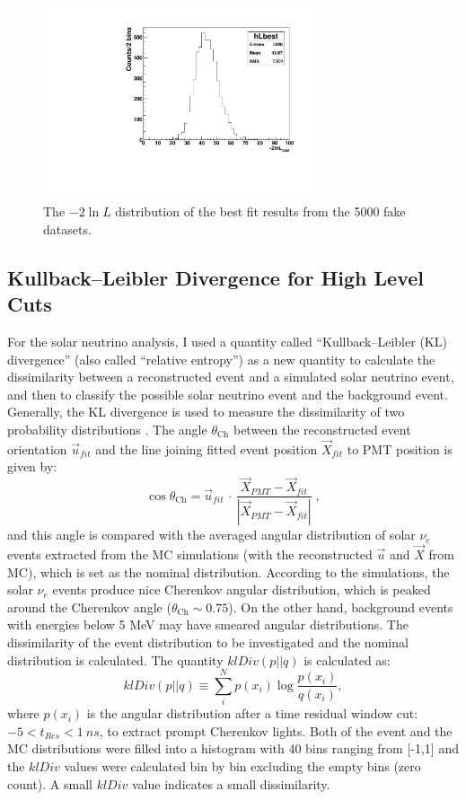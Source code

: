 \begin{figure}[!htb]
	\centering
	\includegraphics[width=8cm]{ensemble_lnLbest.pdf}
	\caption{The $-2\ln L$ distribution of the best fit results from the 5000 fake datasets.}
	\label{poisson_fitLnL}
\end{figure}

\subsection{Kullback–Leibler Divergence for High Level Cuts}

For the solar neutrino analysis, I used a quantity called ``Kullback–Leibler (KL) divergence'' (also called ``relative entropy'') as a new quantity to calculate the dissimilarity between a reconstructed event and a simulated solar neutrino event, and then to classify the possible solar neutrino event and the background event. Generally, the KL divergence is used to measure the dissimilarity of two probability distributions \cite{murphy2012machine}. The angle $\theta_\mathrm{Ch}$ between the reconstructed event orientation $\vec{u}_{fit}$ and the line joining fitted event position $\vec{X}_{fit}$ to PMT position is given by:
\begin{equation*}
\cos\theta_\mathrm{Ch}=\vec{u}_{fit} \, \cdot \, \frac{\vec{X}_{PMT}-\vec{X}_{fit}}{|\vec{X}_{PMT}-\vec{X}_{fit}|} \; ,
\end{equation*}
and this angle is compared with the averaged angular distribution of solar $\nu_e$ events extracted from the MC simulations (with the reconstructed $\vec{u}$ and $\vec{X}$ from MC), which is set as the nominal distribution. According to the simulations, the solar $\nu_e$ events produce nice Cherenkov angular distribution, which is peaked around the Cherenkov angle ($\theta_\mathrm{Ch}\sim 0.75$). On the other hand, background events with energies below 5 MeV may have smeared angular distributions. The dissimilarity of the event distribution to be investigated and the nominal distribution is calculated. The quantity $klDiv(p||q)$ is calculated as: 
\begin{equation}\label{eq:kldiv}
klDiv(p||q) \equiv \sum_{i}^N p(x_i)\log{\frac{p(x_i)}{q(x_i)}},
\end{equation}
where $p(x_i)$ is the angular distribution after a time residual window cut: $-5<t_{Res}<1~ns$, to extract prompt Cherenkov lights. Both of the event and the MC distributions were filled into a histogram with 40 bins ranging from [-1,1] and the $klDiv$ values were calculated bin by bin excluding the empty bins (zero count). A small $klDiv$ value indicates a small dissimilarity.

